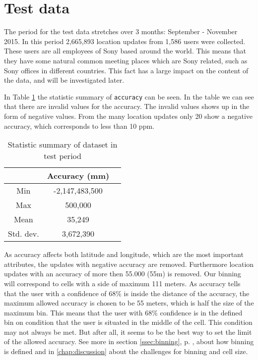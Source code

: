 \section{Test data}
The period for the test data stretches over 3 months: September - November 2015.   
In this period 2,665,893 location updates from 1,586 users were collected. These users are all employees of Sony based around the world. This means that they have some natural common meeting places which are Sony related, such as Sony offices in different countries.
This fact has a large impact on the content of the data, and will be investigated later. 


In Table \ref{tab:stat_geo_p1} the statistic summary of \texttt{accuracy} can be seen. 
In the table we can see that there are invalid values for the accuracy. The invalid values shows up in the form of negative values. 
From the many location updates only 20 show a negative accuracy, which corresponds to less than 10 ppm.  


\begin{table}[H]
        \centering
        \small
        \setlength\tabcolsep{2pt}
        \begin{tabular}{|c|c|c|}
            \hline
                         & Accuracy (mm)          \\[0pt]
            \hline
                 Min     &  -2,147,483,500             \\
            \hline
                 Max     &  500,000                \\
            \hline
                 Mean    & 35,249                      \\
            \hline
                Std. dev.   & 3,672,390                \\
            \hline
        \end{tabular}
        \caption{Statistic summary of dataset in test period}
        \label{tab:stat_geo_p1}
\end{table}

As accuracy affects both latitude and longitude, which are the most important attributes, the updates with negative accuracy are removed. Furthermore location updates with an accuracy of more then 55.000 (55m) is removed. Our binning will correspond to cells with a side of maximum 111 meters. As accuracy tells that the user with a confidence of 68\% is inside the distance of the accuracy, the maximum allowed accuracy is chosen to be 55 meters, which is half the size of the maximum bin. This means that the user with 68\% confidence is in the defined bin on condition that the user is situated in the middle of the cell. This condition may not always be met. But after all, it seems to be the best way to set the limit of the allowed accuracy. 
See more in section \ref{ssec:binning}, p. \pageref{ssec:binning}, about how binning is defined and in \autoref{chap:discussion} about the challenges for binning and cell size. 


